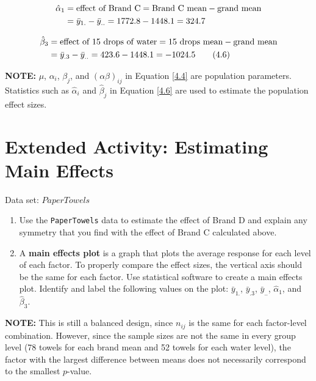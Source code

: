 \documentclass[
]{report}
\providecommand{\tightlist}{%
  \setlength{\itemsep}{0pt}\setlength{\parskip}{0pt}}
\begin{document}
\begin{align}
\hat{\alpha}_1 &= \text{effect of Brand C} = \text{Brand C mean} - \text{grand mean} \notag \\
&= \bar{y}_{1.} - \bar{y}_{..} = 1772.8 - 1448.1 = 324.7 \notag
\end{align}

\begin{align}\label{4.6}
\hat{\beta}_3 &= \text{effect of 15 drops of water} = \text{15 drops mean} - \text{grand mean} \notag \\
&= \bar{y}_{.3} - \bar{y}_{..} = 423.6 - 1448.1 = -1024.5 \tag{4.6}
\end{align}

\large

\textbf{NOTE:}
\(\mu\), \(\alpha_i\), \(\beta_j\), and \((\alpha\beta)_{ij}\) in Equation \ref{4.4} are population parameters. Statistics such as \(\hat{\alpha}_i\) and \(\hat{\beta}_j\) in Equation \ref{4.6} are used to estimate the population effect sizes.
\normalsize

\hypertarget{extended-activity-estimating-main-effects}{%
\section*{Extended Activity: Estimating Main Effects}\label{extended-activity-estimating-main-effects}}

Data set: \(PaperTowels\)

\begin{enumerate}
\def\labelenumi{\arabic{enumi}.}
\setcounter{enumi}{23}
\tightlist
\item
  Use the \texttt{PaperTowels} data to estimate the effect of Brand D and explain any symmetry that you find with the effect of Brand C calculated above.
\item
  A \textbf{main effects plot} is a graph that plots the average response for each level of each factor. To properly compare the effect sizes, the vertical axis should be the same for each factor. Use statistical software to create a main effects plot. Identify and label the following values on the plot: \(\bar{y}_{1.}\), \(\bar{y}_{.3}\), \(\bar{y}_{..}\), \(\hat{\alpha}_1\), and \(\hat{\beta}_3\).
\end{enumerate}

\large

\textbf{NOTE:}
This is still a balanced design, since \(n_{ij}\) is the same for each factor-level combination. However, since the sample sizes are not the same in every group level (78 towels for each brand mean and 52 towels for each water level), the factor with the largest difference between means does not necessarily correspond to the smallest \(p\)-value.
\normalsize
\end{document}
